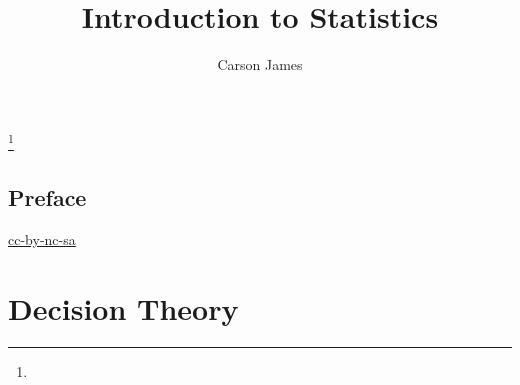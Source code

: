 \documentclass{book}
\begin{document}
	
	\frontmatter
	
	\title{Introduction to Statistics}
	
	
	\author{Carson James}
	\thanks{}
	
	\date{}
	
	\maketitle
	
	
	\setcounter{page}{4}
	
	\tableofcontents
	\printunsrtglossary[type=symbols,style=long,title={Notation}]
	
	
	\mainmatter
	
	\chapter*{Preface}
	
	\begin{flushleft}
		\href{https://creativecommons.org/licenses/by-nc-sa/4.0/legalcode.txt}{cc-by-nc-sa}
	\end{flushleft}




















	\part{Decision Theory}
	
\end{document}
